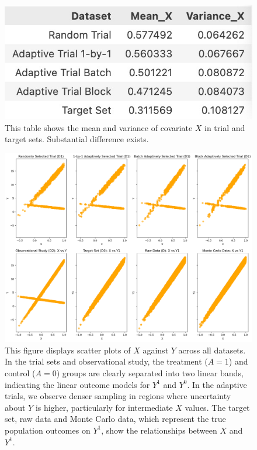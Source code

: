 \documentclass[12pt, oneside]{amsart}
\theoremstyle{definition}
\theoremstyle{remark}
\numberwithin{equation}{section}
\begin{document}
\begin{figure}[hbt!]
    \centering
    \includegraphics[scale=0.3]{Report/Figure/Xmismatch.jpg}
    \caption{This table shows the mean and variance of covariate $X$ in trial and target sets. Substantial difference exists.}
    \label{Xmismatch}
\end{figure}
\FloatBarrier


\begin{figure}[hbt!]
    \centering
    \includegraphics[scale=0.25]{Report/Figure/XvsY.jpg}
    \caption{This figure displays scatter plots of $X$ against $Y$ across all datasets. In the trial sets and observational study, the treatment ($A=1$) and control ($A=0$) groups are clearly separated into two linear bands, indicating the linear outcome models for $Y^1$ and $Y^0$. In the adaptive trials, we observe denser sampling in regions where uncertainty about $Y$ is higher, particularly for intermediate $X$ values. The target set, raw data and Monte Carlo data, which represent the true population outcomes on $Y^1$, show the relationships between $X$ and $Y^1$.}
    \label{XvsY}
\end{figure}
\FloatBarrier
    
\end{document}
